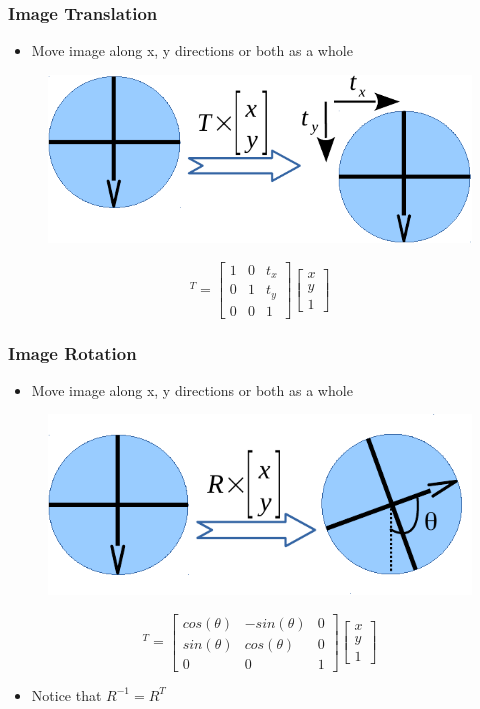 \begin{frame}
\frametitle {Image Translation}
\begin{itemize}
	\item {Move image along x, y directions or both as a whole}
\end{itemize}
\vspace{0.15in}
\begin{figure}
	{\includegraphics[width=0.6\linewidth]{./figs/imgtrans_trans.pdf}}
\end{figure}
\begin{equation}
	[x'~~y'~~1]^T= \left[ \begin{array}{ccc}
	1 & 0 & t_x \\
	0 & 1 & t_y \\
	0 & 0 & 1 
	\end{array} \right] \left[ \begin{array}{c}
	x \\
	y \\
	1
	\end{array} \right]
\end{equation}
\end{frame}

\begin{frame}
\frametitle {Image Rotation}
\begin{itemize}
	\item {Move image along x, y directions or both as a whole}
\end{itemize}
\vspace{0.1in}
\begin{figure}
	{\includegraphics[width=0.6\linewidth]{./figs/imgtrans_rotate.pdf}}
\end{figure}
\begin{equation}
	[x'~~y'~~1]^T=\left[ \begin{array}{ccc}
	cos(\theta) & -sin(\theta) & 0 \\
	sin(\theta) & cos(\theta) & 0 \\
	0 & 0 & 1 
	\end{array} \right] \left[ \begin{array}{c}
	x \\
	y \\
	1
	\end{array} \right]
\end{equation}
\begin{itemize}
	\item {Notice that $R^{-1}=R^{T}$}
\end{itemize}
\end{frame}

